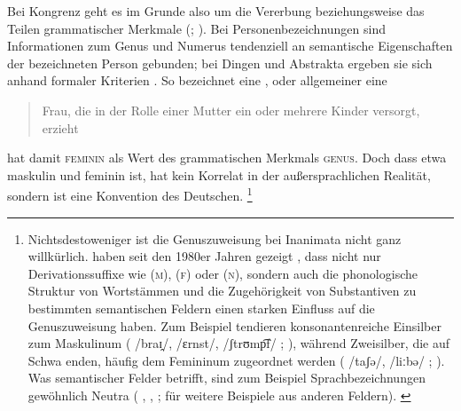 Bei Kongrenz geht es im Grunde also um die Vererbung beziehungsweise das Teilen
grammatischer Merkmale (; \cite{corbett2012}). Bei
Personenbezeichnungen sind Informationen zum Genus und Numerus tendenziell an
semantische Eigenschaften der bezeichneten Person gebunden; bei Dingen und
Abstrakta ergeben sie sich anhand formaler Kriterien \autocites[vgl.][2--4,
125--132]{corbett2006}{koepckezubin2017}. So bezeichnet  eine
, oder allgemeiner
eine \blockcquote[s.\,v.~]{duden-online}{Frau, die in der Rolle
einer Mutter ein oder mehrere Kinder versorgt, erzieht}.  hat damit
\textsc{feminin} als Wert des grammatischen Merkmals \textsc{genus}. Doch dass
etwa  maskulin und  feminin ist, hat kein Korrelat in der
außersprachlichen Realität, sondern ist eine Konvention des
Deutschen.%
%
	\footnote{Nichtsdestoweniger ist die Genuszuweisung bei Inanimata nicht
		ganz willkürlich. \citeauthor{koepckezubin2017} haben seit den 1980er
		Jahren gezeigt
		\autocites[z.\,B.][]%
			{koepcke1982}%
			{koepckezubin1996}%
			{koepckezubin2009}%
			{koepckezubin2017},
		dass nicht nur Derivationssuffixe wie
			 (\textsc{m}),
			 (\textsc{f}) oder
			 (\textsc{n}),
		sondern auch die phonologische Struktur von Wortstämmen und die
		Zugehörigkeit von Substantiven zu bestimmten semantischen Feldern einen
		starken Einfluss auf die Genuszuweisung haben. Zum Beispiel tendieren
		konsonantenreiche Einsilber zum Maskulinum (%
			 /braɪ̯/,
			 /ɛrnst/,
			 /ʃtrʊmp͡f/%
			;
		\cite[vgl.][475--479]{koepckezubin1996}), während Zweisilber, die auf
		Schwa enden, häufig dem Femininum zugeordnet werden (%
			 /taʃə/,
			 /liːbə/%
			;
		\cite[vgl.][207--209]{koepckezubin2017}). Was semantischer Felder
		betrifft, sind zum Beispiel Sprachbezeichnungen gewöhnlich Neutra (%
			,
			,
			;
		\cites[vgl.]%
			[480]{koepckezubin1996}%
			[137--139]{koepckezubin2009}%
			[210--214]{koepckezubin2017}
		für weitere Beispiele aus anderen Feldern).%
		\label{fn:koepckezubin}
	}

